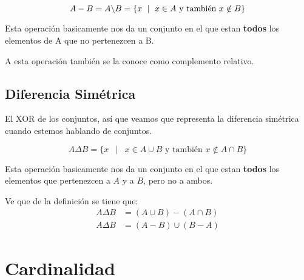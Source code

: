 \documentclass[12pt]{report}                                    %
\DeclareMathOperator \Space {\quad}                             %
\DeclareMathOperator \MiniSpace {\;}                            %
\newcommand \Such {\MiniSpace|\MiniSpace}                       %
\begin{document}
            \begin{equation}
                A - B = A \char`\\ B = \{ x \Such x \in A \text{ y también }  x \notin B \}
            \end{equation}

            Esta operación basicamente nos da un conjunto en el que estan \textbf{todos} los elementos
            de A que no pertenezcen a B.

            A esta operación también se la conoce como complemento relativo.



        \clearpage
        \subsection{Diferencia Simétrica}

            El XOR de los conjuntos, así que veamos que representa la diferencia simétrica cuando estemos
            hablando de conjuntos.

            \begin{equation}
                A \Delta B = \{ x \Such x \in A \cup B \text{ y también }  x \notin A \cap B \}
            \end{equation}

            Esta operación basicamente nos da un conjunto en el que estan \textbf{todos} los elementos
            que pertenezcen a $A$ y a $B$, pero no a ambos.

            Ve que de la definición se tiene que:
            \begin{equation*}
            \begin{split}
                A \Delta B &= (A \cup B) - ( A \cap B) \\
                A \Delta B &= (A - B) \cup ( B - A)
            \end{split}
            \end{equation*}






           

    \clearpage
    \section{Cardinalidad}
            
\end{document}
